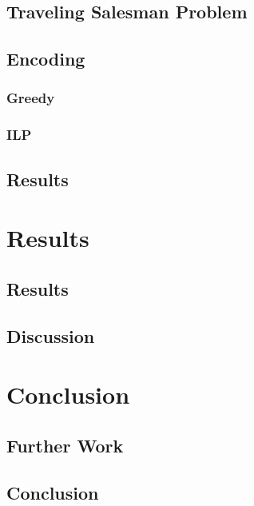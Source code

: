 \documentclass[bsc,frontabs,twoside,singlespacing,parskip,deptreport]{infthesis}     %
\begin{document}
\section{Traveling Salesman Problem}
\section{Encoding}
\subsection{Greedy}
\subsection{ILP}
\section{Results}

\chapter{Results}
\section{Results}
\section{Discussion}
\chapter{Conclusion}
\section{Further Work}
\section{Conclusion}


\end{document}
